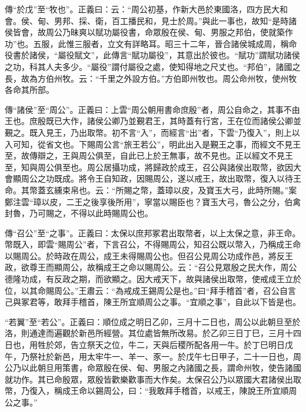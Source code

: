 {\noindent\zhuan{}\fzbyks 傳“於戊”至“牧也”。正義曰：云：“周公初基，作新大邑於東國洛，四方民大和會。侯、甸、男邦、採、衛，百工播民和，見士於周。”與此一事也，故知“是時諸侯皆會，故周公乃昧爽以賦功屬役書，命眾殷在侯、甸、男服之邦伯，使就築作功”也。五服，此惟三服者，立文有詳略耳。昭三十二年，晉合諸侯城成周，稱命役書於諸侯，“屬役賦文”，此傳言“賦功屬役”，其意出於彼也。“賦功”謂賦功諸侯之功，科其人夫多少。“屬役”謂付屬役之處，使知得地之尺丈也。“邦伯”，諸國之長，故為方伯州牧。云：“千里之外設方伯。”方伯即州牧也。周公命州牧，使州牧各命其所部。 \par}

{\noindent\zhuan{}\fzbyks 傳“諸侯”至“周公”。正義曰：上雲“周公朝用書命庶殷”者，周公自命之，其事不由王也。庶殷既已大作，諸侯公卿乃並覲君王，其時蓋有行宮，王在位而諸侯公卿並覲之。既入見王，乃出取幣。初不言“入”，而經言“出”者，下雲“乃復入”，則上以入可知，從省文也。下賜周公言“旅王若公”，明此出入是覲王之事，而經文不見王至，故傳辯之，王與周公俱至，自此已上於王無事，故不見也。正以經文不見王至，知與周公俱至也。周公居攝功成，將歸政於成王，召公與諸侯出取幣，欲因大會顯周公之功既成。將令王自知政，因賜周公，遂以戒王，故出取幣，復入以待王命。其幣蓋玄纁束帛也。云：“所賜之幣，蓋璋以皮，及寶玉大弓，此時所賜。”案鄭注雲“璋以皮，二王之後享後所用”，寧當以賜臣也？寶玉大弓，魯公之分，伯禽封魯，乃可賜之，不得以此時賜周公也。 \par}

{\noindent\zhuan{}\fzbyks 傳“召公”至“之事”。正義曰：太保以庶邦冢君出取幣者，以上太保之意，非王命。幣既入，即雲“賜周公”者，下言召公，不得賜周公，知召公既以幣入，乃稱成王命以賜周公。於時政在周公，成王未得賜周公也。但召公見周公功成作邑，將反王政，欲尊王而顯周公，故稱成王之命以賜周公。云：“召公見眾殷之民大作，周公德隆功成，有反政之期，而欲顯之。因大戒天下，故與諸侯出取幣，使戒成王立於位，以其命賜周公。”王肅云：“為戒成王錫周公是也。”曰“拜手稽首”者，召公自言己與冢君等，敢拜手稽首，陳王所宜順周公之事。“宜順之事”，自此以下皆是也。 \par}

{\noindent\shu{}\fzkt “若翼”至“若公”。正義曰：順位成之明日乙卯，三月十二日也，周公以此朝旦至於洛，則通達而遍觀於新邑所經營。其位處皆無所改易。於乙卯三日丁巳，三月十四日也，用牲於郊，告立祭天之位，牛二，天與后稷所配各用一牛。於丁巳明日戊午，乃祭社於新邑，用太牢牛一、羊一、豕一。於戊午七日甲子，二十一日也，周公乃以此朝旦用策書，命眾殷在侯、甸、男服之內諸國之長，謂命州牧，使告諸國就功作。其已命殷眾，眾殷皆歡樂歡事而大作矣。太保召公乃以眾國大君諸侯出取幣，乃復入，稱成王命以錫周公，曰：“我敢拜手稽首，以戒王，陳說王所宜順周公之事。” \par}

